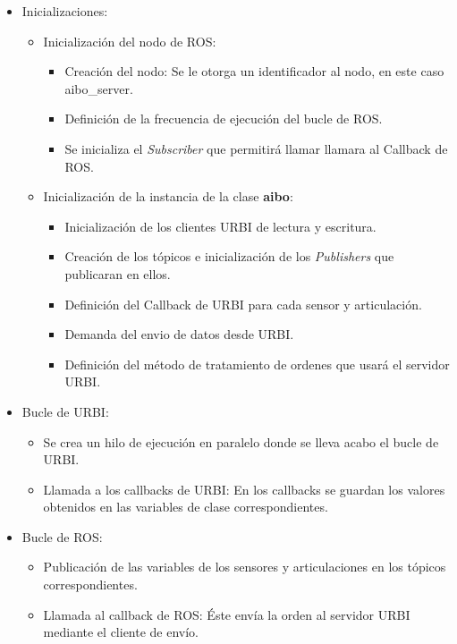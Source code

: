 \documentclass[12pt,a4paper,final,twoside]{article}
\begin{document}
\begin{itemize}
\item Inicializaciones: 
\begin{itemize}
\item Inicialización del nodo de ROS:
\begin{itemize}
\item Creación del nodo: Se le otorga un identificador al nodo, en este caso aibo{\_}server.
\item Definición de la frecuencia de ejecución del bucle de ROS.
\item Se inicializa el \textit{Subscriber} que permitirá llamar llamara al Callback de ROS.   
\end{itemize}

\item Inicialización de la instancia de la clase \textbf{aibo}:
\begin{itemize}
\item Inicialización de los clientes URBI de lectura y escritura.
\item Creación de los tópicos e inicialización de los \textit{Publishers} que publicaran en ellos.
\item Definición del Callback de URBI para cada sensor y articulación.
\item Demanda del envio de datos desde URBI.
\item Definición del método de tratamiento de ordenes que usará el servidor URBI.
\end{itemize}
\end{itemize}
\item Bucle de URBI:
\begin{itemize}
\item Se crea un hilo de ejecución en paralelo donde se lleva acabo el bucle de URBI.
\item Llamada a los callbacks de URBI: En los callbacks se guardan los valores obtenidos en las variables de clase correspondientes.

\end{itemize}
\item Bucle de ROS:
\begin{itemize}
\item Publicación de las variables de los sensores y articulaciones en los tópicos correspondientes.
\item Llamada al callback de ROS: Éste envía la orden al servidor URBI mediante el cliente de envío.
\end{itemize}
\end{itemize}
\end{document}
